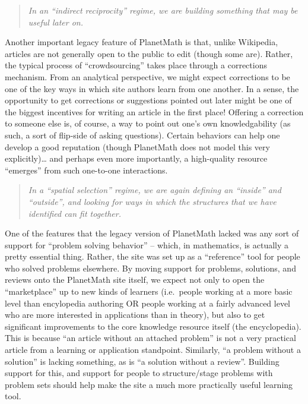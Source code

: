 \begin{quote}
\emph{In an ``indirect reciprocity'' regime, we are building something
that may be useful later on.}
\end{quote}
Another important legacy feature of PlanetMath is that, unlike
Wikipedia, articles are not generally open to the public to edit (though
some are). Rather, the typical process of ``crowdsourcing'' takes place
through a corrections mechanism. From an analytical perspective, we
might expect corrections to be one of the key ways in which site authors
learn from one another. In a sense, the opportunity to get corrections
or suggestions pointed out later might be one of the biggest incentives
for writing an article in the first place! Offering a correction to
someone else is, of course, a way to point out one's own knowledgability
(as such, a sort of flip-side of asking questions). Certain behaviors
can help one develop a good reputation (though PlanetMath does not model
this very explicitly)\ldots{} and perhaps even more importantly, a
high-quality resource ``emerges'' from such one-to-one interactions.

\begin{quote}
\emph{In a ``spatial selection'' regime, we are again defining an
``inside'' and ``outside'', and looking for ways in which the structures
that we have identified can fit together.}
\end{quote}
One of the features that the legacy version of PlanetMath lacked was any
sort of support for ``problem solving behavior'' -- which, in
mathematics, is actually a pretty essential thing. Rather, the site was
set up as a ``reference'' tool for people who solved problems elsewhere.
By moving support for problems, solutions, and reviews onto the
PlanetMath site itself, we expect not only to open the ``marketplace''
up to new kinds of learners (i.e.~people working at a more basic level
than encylopedia authoring OR people working at a fairly advanced level
who are more interested in applications than in theory), but also to get
significant improvements to the core knowledge resource itself (the
encyclopedia). This is because ``an article without an attached
problem'' is not a very practical article from a learning or application
standpoint. Similarly, ``a problem without a solution'' is lacking
something, as is ``a solution without a review''. Building support for
this, and support for people to structure/stage problems with problem
sets should help make the site a much more practically useful learning
tool.

